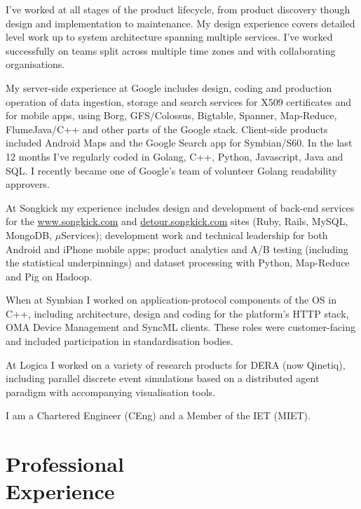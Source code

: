 \documentclass[line]{resume}
\begin{document}
\begin{resume}
    I've worked at all stages of the product lifecycle, from product discovery though design and implementation to
    maintenance. My design experience covers detailed level work up to system architecture spanning multiple services.
    I've worked successfully on teams split across multiple time zones and with collaborating organisations.

    My server-side experience at Google includes design, coding and production operation of data ingestion, storage and
    search services for X509 certificates and for mobile apps, using Borg, GFS/Colossus, Bigtable, Spanner, Map-Reduce,
    FlumeJava/C++ and other parts of the Google stack. Client-side products included Android Maps and the Google Search
    app for Symbian/S60.  In the last 12 months I've regularly coded in Golang, C++, Python, Javascript, Java and SQL.
    I recently became one of Google's team of volunteer Golang readability approvers.

    At Songkick my experience includes design and development of back-end services for the \url{www.songkick.com} and
    \url{detour.songkick.com} sites (Ruby, Rails, MySQL, MongoDB, $\mu$Services); development work and technical
    leadership for both Android and iPhone mobile apps; product analytics and A/B testing (including the statistical
    underpinnings) and dataset processing with Python, Map-Reduce and Pig on Hadoop.

    When at Symbian I worked on application-protocol components of the OS in C++, including architecture, design and
    coding for the platform's HTTP stack, OMA Device Management and SyncML clients.  These roles were customer-facing
    and included participation in standardisation bodies.

    At Logica I worked on a variety of research products for DERA (now Qinetiq), including parallel discrete event
    simulations based on a distributed agent paradigm with accompanying visualisation tools.

    I am a Chartered Engineer (CEng) and a Member of the IET (MIET).


    \section{\mysidestyle Professional\\Experience}


\end{resume}
\end{document}
